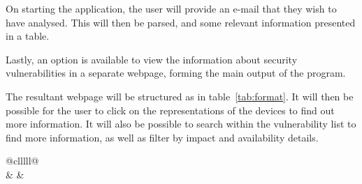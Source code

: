   On starting the application, the user will provide an e-mail that they wish
  to have analysed.  This will then be parsed, and some relevant information
  presented in a table.

  Lastly, an option is available to view the information about security
  vulnerabilities in a separate webpage, forming the main output of the
  program.

  The resultant webpage will be structured as in table~\ref{tab:format}.  It
  will then be possible for the user to click on the representations of the
  devices to find out more information.  It will also be possible to search
  within the vulnerability list to find more information, as well as filter by
  impact and availability details.

  \begin{table}[] \centering \begin{tabular}{@{}clllll@{}} \toprule
                                                                                                                                                                                                                                          \\
    \midrule {} &  &  \\
                                                                                                                                                                                                    \\
                                                                                                                                                                                      \\
                                                      \\
                                                                                                                                                                                                                \\
    \bottomrule \end{tabular} \caption{Format of presented data found in e-mail
    header}\label{tab:format} \end{table}

